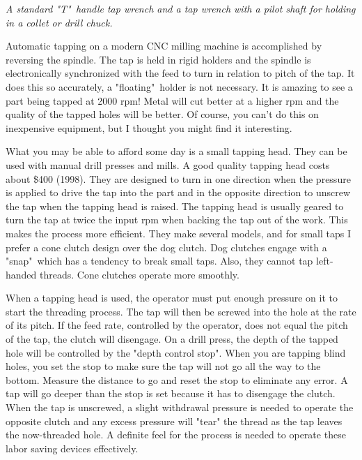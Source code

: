 \bigskip
\textit{A standard "T"\ handle tap wrench and a tap wrench with a pilot shaft
for holding in a collet or drill chuck.}
\bigskip


Automatic tapping on a modern CNC milling machine is accomplished by reversing
the spindle. The tap is held in rigid holders and the spindle is electronically
synchronized with the feed to turn in relation to pitch of the tap. It does this
so accurately, a "floating"\ holder is not necessary. It is amazing to see a
part being tapped at 2000 rpm! Metal will cut better at a higher rpm and the
quality of the tapped holes will be better. Of course, you can't do this on
inexpensive equipment, but I thought you might find it interesting.


What you may be able to afford some day is a small tapping head. They can be
used with manual drill presses and mills. A good quality tapping head costs
about \$400 (1998). They are designed to turn in one direction when the pressure
is applied to drive the tap into the part and in the opposite direction to
unscrew the tap when the tapping head is raised. The tapping head is usually
geared to turn the tap at twice the input rpm when backing the tap out of the
work. This makes the process more efficient. They make several models, and for
small taps I prefer a cone clutch design over the dog clutch. Dog clutches
engage with a "snap"\ which has a tendency to break small taps. Also, they
cannot tap left-handed threads. Cone clutches operate more smoothly.

When a tapping head is used, the operator must put enough pressure on it to
start the threading process. The tap will then be screwed into the hole at the
rate of its pitch. If the feed rate, controlled by the operator, does not equal
the pitch of the tap, the clutch will disengage. On a drill press, the depth of
the tapped hole will be controlled by the "depth control stop". When you are
tapping blind holes, you set the stop to make sure the tap will not go all the
way to the bottom. Measure the distance to go and reset the stop to eliminate
any error. A tap will go deeper than the stop is set because it has to disengage
the clutch. When the tap is unscrewed, a slight withdrawal pressure is needed to
operate the opposite clutch and any excess pressure will "tear" the thread as
the tap leaves the now-threaded hole. A definite feel for the process is needed
to operate these labor saving devices effectively.

